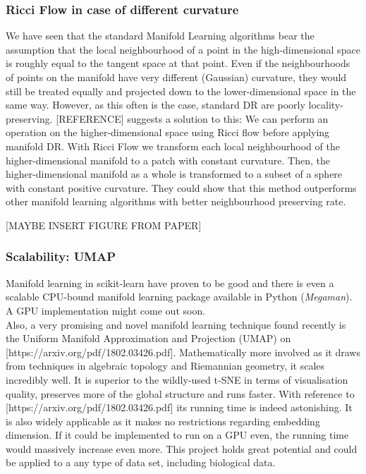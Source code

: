 \documentclass[journal, a4paper]{IEEEtran}
\begin{document}
\subsubsection{Ricci Flow in case of different curvature} 
We have seen that the standard Manifold Learning algorithms bear the assumption that the local neighbourhood of a point in the high-dimensional space is roughly equal to the tangent space at that point. Even if the neighbourhoods of points on the manifold have very different (Gaussian) curvature, they would still be treated equally and projected down to the lower-dimensional space in the same way. However, as this often is the case, standard DR are poorly locality-preserving. [REFERENCE] suggests a solution to this: We can perform an operation on the higher-dimensional space using Ricci flow before applying manifold DR. With Ricci Flow we transform each local neighbourhood of the higher-dimensional manifold to a patch with constant curvature. Then, the higher-dimensional manifold as a whole is transformed to a subset of a sphere with constant positive curvature. They could show that this method outperforms other manifold learning algorithms with better neighbourhood preserving rate.%

[MAYBE INSERT FIGURE FROM PAPER]


\subsubsection{Scalability: UMAP}

Manifold learning in scikit-learn have proven to be good and there is even a scalable CPU-bound manifold learning package available in Python (\textit{Megaman}). A GPU implementation might come out soon.\\
Also, a very promising and novel manifold learning technique found recently is the Uniform Manifold Approximation and Projection (UMAP) on [https://arxiv.org/pdf/1802.03426.pdf]. Mathematically more involved as it draws from techniques in algebraic topology and Riemannian geometry, it scales incredibly well. It is superior to the wildly-used t-SNE in terms of visualisation quality, preserves more of the global structure and runs faster. With reference to [https://arxiv.org/pdf/1802.03426.pdf] its running time is indeed astonishing. It is also widely applicable as it makes no restrictions regarding embedding dimension. If it could be implemented to run on a GPU even, the running time would massively increase even more. This project holds great potential and could be applied to a any type of data set, including biological data.
\end{document}

